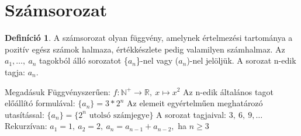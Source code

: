\documentclass[twoside,12pt]{report}
\theoremstyle{definition}
\newtheorem{definition}[theorem]{Definíció}
\begin{document}
\section{Számsorozat}
	\begin{definition}
		A számsorozat olyan függvény, amelynek értelmezési tartománya a pozitív egész számok
		halmaza, értékkészlete pedig valamilyen számhalmaz. Az $a_1,\dots,\ a_n$ tagokból álló sorozatot \{$a_n$\}-nel vagy ($a_n$)-nel jelöljük. A sorozat n-edik tagja: $a_n$.
	\end{definition}
	\begin{outline}
		\1 Megadásuk
			\2 Függvényszerűen: $f:\mathbb{N}^+\longrightarrow\mathbb{R},\ x\mapsto x^2$
			\2 Az n-edik általános tagot előállító formulával: $\{a_n\}=3*2^n$
			\2 Az elemeit egyértelműen meghatározó utasítással: $\{a_n\}=\{2^n \text{ utolsó számjegye}\}$
			\2 A sorozat tagjaival: $3,\ 6,\ 9,\dots$
			\2 Rekurzívan: $a_1=1,\ a_2=2,\ a_n=a_{n-1}+a_{n-2},$ ha $n\ge3$
	\end{outline}
\end{document}
